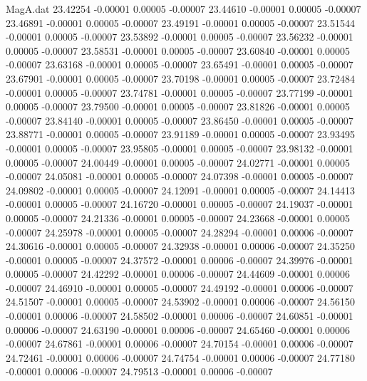 \begin{filecontents}{MagA.dat}
  23.42254   -0.00001    0.00005   -0.00007
  23.44610   -0.00001    0.00005   -0.00007
  23.46891   -0.00001    0.00005   -0.00007
  23.49191   -0.00001    0.00005   -0.00007
  23.51544   -0.00001    0.00005   -0.00007
  23.53892   -0.00001    0.00005   -0.00007
  23.56232   -0.00001    0.00005   -0.00007
  23.58531   -0.00001    0.00005   -0.00007
  23.60840   -0.00001    0.00005   -0.00007
  23.63168   -0.00001    0.00005   -0.00007
  23.65491   -0.00001    0.00005   -0.00007
  23.67901   -0.00001    0.00005   -0.00007
  23.70198   -0.00001    0.00005   -0.00007
  23.72484   -0.00001    0.00005   -0.00007
  23.74781   -0.00001    0.00005   -0.00007
  23.77199   -0.00001    0.00005   -0.00007
  23.79500   -0.00001    0.00005   -0.00007
  23.81826   -0.00001    0.00005   -0.00007
  23.84140   -0.00001    0.00005   -0.00007
  23.86450   -0.00001    0.00005   -0.00007
  23.88771   -0.00001    0.00005   -0.00007
  23.91189   -0.00001    0.00005   -0.00007
  23.93495   -0.00001    0.00005   -0.00007
  23.95805   -0.00001    0.00005   -0.00007
  23.98132   -0.00001    0.00005   -0.00007
  24.00449   -0.00001    0.00005   -0.00007
  24.02771   -0.00001    0.00005   -0.00007
  24.05081   -0.00001    0.00005   -0.00007
  24.07398   -0.00001    0.00005   -0.00007
  24.09802   -0.00001    0.00005   -0.00007
  24.12091   -0.00001    0.00005   -0.00007
  24.14413   -0.00001    0.00005   -0.00007
  24.16720   -0.00001    0.00005   -0.00007
  24.19037   -0.00001    0.00005   -0.00007
  24.21336   -0.00001    0.00005   -0.00007
  24.23668   -0.00001    0.00005   -0.00007
  24.25978   -0.00001    0.00005   -0.00007
  24.28294   -0.00001    0.00006   -0.00007
  24.30616   -0.00001    0.00005   -0.00007
  24.32938   -0.00001    0.00006   -0.00007
  24.35250   -0.00001    0.00005   -0.00007
  24.37572   -0.00001    0.00006   -0.00007
  24.39976   -0.00001    0.00005   -0.00007
  24.42292   -0.00001    0.00006   -0.00007
  24.44609   -0.00001    0.00006   -0.00007
  24.46910   -0.00001    0.00005   -0.00007
  24.49192   -0.00001    0.00006   -0.00007
  24.51507   -0.00001    0.00005   -0.00007
  24.53902   -0.00001    0.00006   -0.00007
  24.56150   -0.00001    0.00006   -0.00007
  24.58502   -0.00001    0.00006   -0.00007
  24.60851   -0.00001    0.00006   -0.00007
  24.63190   -0.00001    0.00006   -0.00007
  24.65460   -0.00001    0.00006   -0.00007
  24.67861   -0.00001    0.00006   -0.00007
  24.70154   -0.00001    0.00006   -0.00007
  24.72461   -0.00001    0.00006   -0.00007
  24.74754   -0.00001    0.00006   -0.00007
  24.77180   -0.00001    0.00006   -0.00007
  24.79513   -0.00001    0.00006   -0.00007

\end{filecontents}
